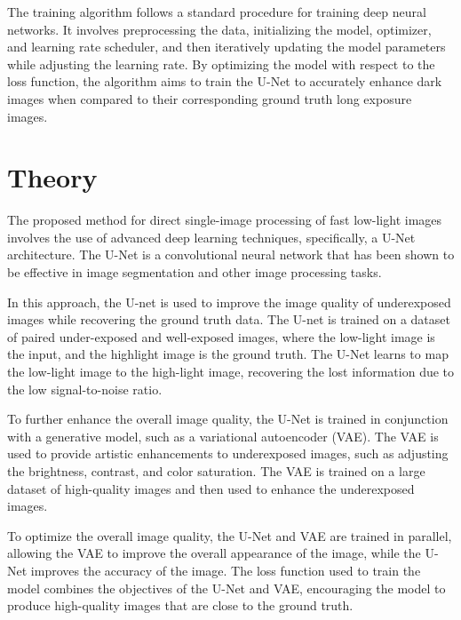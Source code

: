 \documentclass{article}
\begin{document}
The training algorithm follows a standard procedure for training deep neural networks. It involves preprocessing the data, initializing the model, optimizer, and learning rate scheduler, and then iteratively updating the model parameters while adjusting the learning rate. By optimizing the model with respect to the loss function, the algorithm aims to train the U-Net to accurately enhance dark images when compared to their corresponding ground truth long exposure images.



\section{Theory} %

The proposed method for direct single-image processing of fast low-light images involves the use of advanced deep learning techniques, specifically, a U-Net architecture. The U-Net is a convolutional neural network that has been shown to be effective in image segmentation \cite{UNetBasedMedicalImageSegmentation} and other image processing tasks. 

In this approach, the U-net is used to improve the image quality of underexposed images while recovering the ground truth data. The U-net is trained on a dataset of paired under-exposed and well-exposed images, where the low-light image is the input, and the highlight image is the ground truth. The U-Net learns to map the low-light image to the high-light image, recovering the lost information due to the low signal-to-noise ratio.

To further enhance the overall image quality, the U-Net is trained in conjunction with a generative model, such as a variational autoencoder (VAE). The VAE is used to provide artistic enhancements to underexposed images, such as adjusting the brightness, contrast, and color saturation. The VAE is trained on a large dataset of high-quality images and then used to enhance the underexposed images.

To optimize the overall image quality, the U-Net and VAE are trained in parallel, allowing the VAE to improve the overall appearance of the image, while the U-Net improves the accuracy of the image. The loss function used to train the model combines the objectives of the U-Net and VAE, encouraging the model to produce high-quality images that are close to the ground truth.
\end{document}

